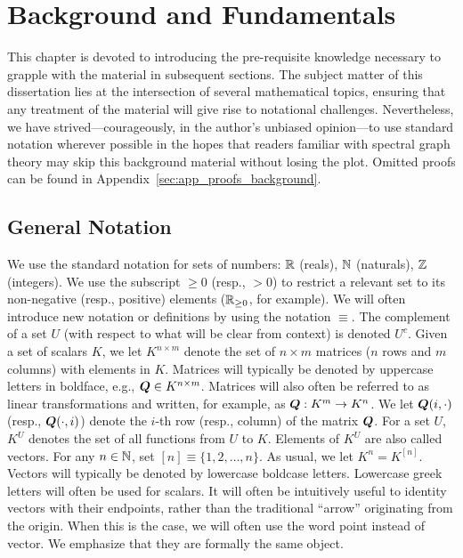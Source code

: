 \chapter{Background and Fundamentals}
\label{chap:background}

This chapter is devoted to introducing the  pre-requisite knowledge necessary to grapple with the material in subsequent sections. The subject matter of this dissertation lies at the intersection of several mathematical topics, ensuring that any treatment  of the material will give rise to notational challenges. Nevertheless, we have strived---courageously, in the author's unbiased opinion---to use standard notation wherever possible in the hopes that readers familiar with spectral graph theory may skip this background material without losing the plot. Omitted proofs  can be found  in  Appendix~\ref{sec:app_proofs_background}. 


\section{General Notation}
\label{sec:background_general}
We use the standard notation for sets of numbers: $\mathbb{R}$ (reals), $\mathbb{N}$ (naturals), $\mathbb{Z}$ (integers).  We use the subscript $\geq 0$ (resp., $>0$) to restrict a relevant set to its non-negative (resp., positive) elements ($\mathbb{R}_{\geq 0}$, for example). 
We will often introduce new notation or definitions by using the notation $\equiv$. The complement of a set $U$ (with respect to what will be clear from context) is denoted $U^c$. 
Given a set of scalars $K$, we let $K^{n\times m}$ denote the set of $n\times m$ matrices ($n$ rows and $m$ columns) with elements in $K$. Matrices will typically be denoted by uppercase letters in boldface, e.g., $\vb*{Q}\in K^{n\times m}$. Matrices will also often be referred to as linear transformations and written, for example, as $\vb*{Q}:K^m \to K^n$. 
We let $\vb*{Q}(i,\cdot)$ (resp., $\vb*{Q}(\cdot,i)$) denote the $i$-th row (resp., column) of the matrix $\vb*{Q}$. 
For a set $U$, $K^U$ denotes the set of all functions from $U$ to $K$.  Elements of $K^U$ are also called vectors. For any $n\in\mathbb{N}$, set $[n]\equiv \{1,2,\dots,n\}$. As usual, we let $K^n=K^{[n]}$. Vectors will typically be denoted by lowercase boldcase letters. Lowercase  greek letters will often be used for scalars. It will often  be intuitively useful to identity vectors with their endpoints, rather than the traditional ``arrow'' originating from the origin. When this is the case, we will often use the word point instead of vector. We emphasize that they are formally the same object. 

